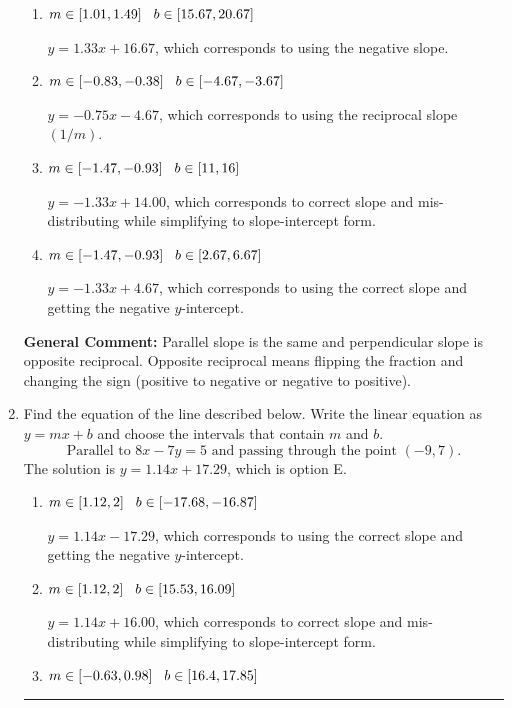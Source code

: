 \documentclass{extbook}[14pt]
\newcommand{\litem}[1]{\item #1

\rule{\textwidth}{0.4pt}}
\begin{document}
\begin{enumerate}
{\begin{enumerate}[label=\Alph*.]
* $y = -1.33x - 4.67$, which is the correct option.
\item \( m \in [1.01, 1.49] \hspace*{3mm} b \in [15.67, 20.67] \)

 $y = 1.33x + 16.67$, which corresponds to using the negative slope.
\item \( m \in [-0.83, -0.38] \hspace*{3mm} b \in [-4.67, -3.67] \)

 $y = -0.75x - 4.67$, which corresponds to using the reciprocal slope $(1/m)$.
\item \( m \in [-1.47, -0.93] \hspace*{3mm} b \in [11, 16] \)

 $y = -1.33x + 14.00$, which corresponds to correct slope and mis-distributing while simplifying to slope-intercept form.
\item \( m \in [-1.47, -0.93] \hspace*{3mm} b \in [2.67, 6.67] \)

 $y = -1.33x + 4.67$, which corresponds to using the correct slope and getting the negative $y$-intercept.
\end{enumerate}

\textbf{General Comment:} Parallel slope is the same and perpendicular slope is opposite reciprocal. Opposite reciprocal means flipping the fraction and changing the sign (positive to negative or negative to positive).
}
\litem{
Find the equation of the line described below. Write the linear equation as $ y=mx+b $ and choose the intervals that contain $m$ and $b$.
\[ \text{Parallel to } 8 x - 7 y = 5 \text{ and passing through the point } (-9, 7). \]
The solution is \( y = 1.14x + 17.29 \), which is option E.\begin{enumerate}[label=\Alph*.]
\item \( m \in [1.12, 2] \hspace*{3mm} b \in [-17.68, -16.87] \)

 $y = 1.14x - 17.29$, which corresponds to using the correct slope and getting the negative $y$-intercept.
\item \( m \in [1.12, 2] \hspace*{3mm} b \in [15.53, 16.09] \)

 $y = 1.14x + 16.00$, which corresponds to correct slope and mis-distributing while simplifying to slope-intercept form.
\item \( m \in [-0.63, 0.98] \hspace*{3mm} b \in [16.4, 17.85] \)


\end{enumerate}}
\end{enumerate}
\end{document}
